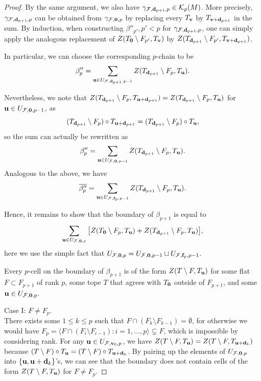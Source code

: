 \documentclass[10pt,a4paper]{amsart}
\newcommand\Fcal{{\mathcal F}}
\newcommand\Kcal{{\mathcal K}}
\newcommand\dd{{\bf d}}
\newcommand\ff{{\bf f}}
\newcommand\uu{{\bf u}}
\newcommand\vv{{\bf v}}
\begin{document}
\begin{proof}
By the same argument, we also have 
$\gamma_{\Fcal, \dd_{p+1},p}\in\Kcal_p(M)$.
More precisely, $\gamma_{\Fcal, \dd_{p+1},p}$ can be obtained from $\gamma_{\Fcal, {\bf 0},p}$ by replacing every $T_{\bf v}$ by $T_{{\bf v}+\dd_{p+1}}$ in the sum.
By induction, when constructing $\beta''_{p'}, p'<p$ for $\gamma_{\Fcal, \dd_{p+1},p}$, one can simply apply the analogous replacement of $Z(T_{\bf 0}\setminus F_{p'},T_\vv)$ by $Z(T_{\dd_{p+1}}\setminus F_{p'},T_{{\bf v}+\dd_{p+1}})$.

In particular, we can choose the corresponding $p$-chain to be 
$$\beta_p'' = \sum_{{\bf u}\in U_{\Fcal,\dd_{p+1}, p-1}} Z(T_{\dd_{p+1}} \setminus F_p,T_{\bf u}).$$

Nevertheless, we note that $Z(T_{\dd_{p+1}} \setminus F_p,T_{\uu+\dd_{p+1}})=Z(T_{\dd_{p+1}} \setminus F_p,T_{\bf u})$ for ${\bf u}\in U_{\Fcal,{\bf 0},p-1}$, as $$(T_{\dd_{p+1}}\setminus F_p)\circ T_{{\bf u}+\dd_{p+1}}=(T_{\dd_{p+1}}\setminus F_p)\circ T_{\bf u},$$ so the sum can actually be rewritten as
\begin{equation} \label{eq:2nd_chain}
  \beta_p'' =  \sum_{{\bf u}\in U_{\Fcal,{\bf 0}, p-1}} Z(T_{\dd_{p+1}} \setminus F_p,T_{\bf u}).
\end{equation}
Analogous to the above, 
we have $$\overline{\beta''_p} = \sum_{{\bf u}\in U_{\Fcal,\ff_p, p-1}} Z(T_{\dd_{p+1}} \setminus F_p,T_{\bf u}).$$

Hence, it remains to show that the boundary of
$\beta_{p+1}$ is equal to 
\begin{equation} \label{eq:target_chain}
    \sum_{{\bf u}\in U_{\Fcal,{\bf 0}, p}}\big[Z(T_{\bf 0}\setminus F_p,T_{\bf u})+Z(T_{\dd_{p+1}} \setminus F_p,T_{\bf u})\big],
\end{equation}
here we use the simple fact that $U_{\Fcal,{\bf 0}, p}=U_{\Fcal,{\bf 0}, p-1}\sqcup U_{\Fcal,\ff_p, p-1}$.

Every $p$-cell on the boundary of $\beta_{p+1}$ is of the form $Z(T\setminus F,T_{\bf u})$ for some flat $F\subset F_{p+1}$ of rank $p$, some tope $T$ that agrees with $T_{\bf 0}$ outside of $F_{p+1}$, and some ${\bf u}\in U_{\Fcal, {\bf 0}, p}$.

Case I: $F\neq F_p$.\\
There exists some $1\leq k\leq p$ such that $F\cap(F_k\setminus F_{k-1})=\emptyset$, for otherwise we would have $F_p = \langle F\cap(F_i\setminus F_{i-1}): i=1,\ldots,p\rangle\subsetneq F$, which is impossible by considering rank.
For any ${\bf u}\in U_{\Fcal,{\bf v}_0, p}$, we have $Z(T\setminus F,T_{\bf u})=Z(T\setminus F,T_{{\bf u}+\dd_k})$ because $(T\setminus F)\circ T_{\bf u}=(T\setminus F)\circ T_{{\bf u}+\dd_k}$.
By pairing up the elements of $U_{\Fcal,{\bf 0}, p}$ into $\{{\bf u}, {\bf u}+\dd_k\}$'s, we can see that the boundary does not contain cells of the form $Z(T\setminus F,T_{\bf u})$ for $F\neq F_p$. 


\end{proof}
\end{document}
